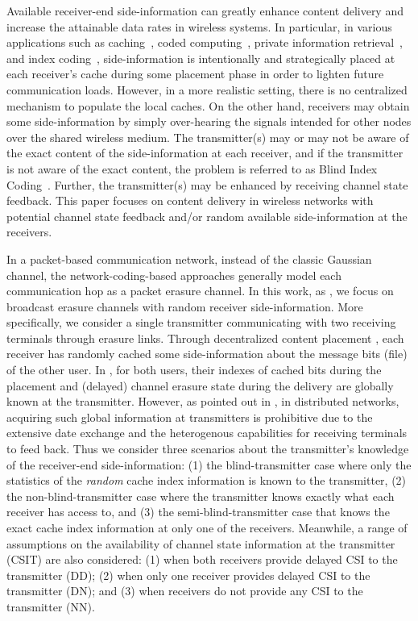 \documentclass[journal,12pt,draftcls,onecolumn]{IEEEtran}
\begin{document}
Available receiver-end side-information can greatly enhance content delivery and increase the attainable data rates in wireless systems. In particular, in various applications such as caching~\cite{maddah2015cache,naderializadeh2017fundamental}, coded computing~\cite{prakash2018coded}, private information retrieval~\cite{chor1995private,sun2017private}, and index coding~\cite{bar2011index,chaudhry2008efficient,maleki2014index}, side-information is intentionally and strategically placed at each receiver's cache during some placement phase in order to lighten future communication loads. However, in a more realistic setting, there is no centralized mechanism to populate the local caches. On the other hand, receivers may obtain some side-information by simply over-hearing the signals intended for other nodes over the shared wireless medium. The transmitter(s) may or may not be aware of the exact content of the side-information at each receiver, and if the transmitter is not aware of the exact content, the problem is referred to as Blind Index Coding~\cite{kao2016blind}. Further, the transmitter(s) may be enhanced by receiving channel state feedback. This paper focuses on content delivery in  wireless networks with potential channel state feedback and/or random available side-information at the receivers.


In a packet-based communication network, instead of the classic Gaussian channel, the network-coding-based approaches generally model each communication hop as a packet erasure channel. In this work, as \cite{ghorbel2016content}, we focus on broadcast erasure channels with random receiver side-information. More specifically, we consider a single transmitter communicating with two receiving terminals through erasure links. Through decentralized content placement \cite{kao2016blind}\cite{ghorbel2016content}, each receiver has randomly cached some side-information about the message bits (file) of the other user. In \cite{ghorbel2016content},  for both users, their indexes of cached bits during the placement and (delayed) channel erasure state during the delivery are globally known at the transmitter. However, as pointed out in \cite{DistributedICShamai}\cite{lin2019no}, in distributed networks, acquiring such global information at transmitters is prohibitive due to the extensive date exchange and the heterogenous capabilities for receiving terminals to feed back. Thus we consider three scenarios about the transmitter's knowledge of the receiver-end side-information: {(1) the blind-transmitter case where only the statistics of the \emph{random} cache index information is known to the transmitter, (2) the non-blind-transmitter case where the transmitter knows exactly what each receiver has access to, and (3) the semi-blind-transmitter case that knows the exact cache index information at only one of the receivers}. Meanwhile, a range of assumptions on the availability of channel state information at the transmitter (CSIT) are also considered: (1) when both receivers provide delayed CSI to the transmitter (DD); (2) when only one receiver provides delayed CSI to the transmitter (DN); and (3) when receivers do not provide any CSI to the transmitter (NN).
\end{document}
